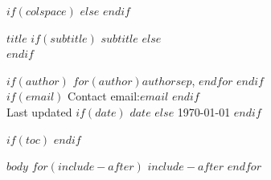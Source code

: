 \documentclass[$if(fontsize)$$fontsize$,$endif$$if(lang)$$lang$,$endif$$if(papersize)$$papersize$,$endif$$for(classoption)$$classoption$$sep$,$endfor$]{$documentclass$}
\begin{document}
\pagestyle{projectnum}
\thispagestyle{firstpage}
\afterpage{\aftergroup\restoregeometry}

$if(colspace)$
\setlength{\tabcolsep}{$colspace$}
$else$
\setlength{\tabcolsep}{12pt}
$endif$

\Large
{\sbf $title$}\newline
$if(subtitle)$
{\sf\normalsize $subtitle$}
$else$
\phantom{text}\\[-40pt]
$endif$

\sf\normalsize{
$if(author)$
$for(author)$$author$$sep$, $endfor$\newline
$endif$
}\\[-34pt]

\sf\normalsize{
$if(email)$
Contact email:\;$email$
$endif$
}\\[-20pt]

Last updated $if(date)$
$date$
$else$
\today
$endif$
\vspace{5mm}



$if(toc)$
\setcounter{page}{1}
\setcounter{tocdepth}{2}
\tableofcontents
$endif$


$body$
$for(include-after)$
$include-after$
$endfor$
\end{document}
